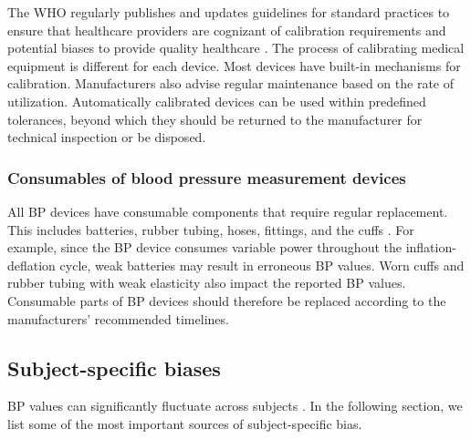\documentclass[journal,article,moreauthors]{Definitions/mdpi}
\begin{document}
The WHO regularly publishes and updates guidelines for standard practices to ensure that healthcare providers are cognizant of calibration requirements and potential biases to provide quality healthcare \citep{yayan2020key}. The process of calibrating medical equipment is different for each device. Most devices have built-in mechanisms for calibration. 
Manufacturers also advise regular maintenance based on the rate of utilization. 
Automatically calibrated devices can be used within predefined tolerances, beyond which they should be returned to the manufacturer for technical inspection or be disposed.

\subsubsection{Consumables of blood pressure measurement devices}
All BP devices have consumable components that require regular replacement. This includes batteries, rubber tubing, hoses, fittings, and the cuffs \citep{worldtechnical}. For example, since the BP device consumes variable power throughout the inflation-deflation cycle, weak batteries may result in erroneous BP values. Worn cuffs and rubber tubing with weak elasticity also impact the reported BP values. Consumable parts of BP devices should therefore be replaced according to the manufacturers' recommended timelines.

\subsection{Subject-specific biases} BP values can significantly fluctuate across subjects \citep{pickering2005recommendations}. In the following section, we list some of the most important sources of subject-specific bias.
\end{document}
